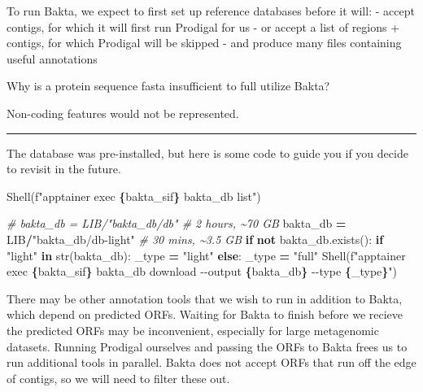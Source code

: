 \documentclass[
]{book}
\newenvironment{Shaded}{\begin{snugshade}}{\end{snugshade}}
\newcommand{\BuiltInTok}[1]{#1}
\newcommand{\CommentTok}[1]{\textcolor[rgb]{0.56,0.35,0.01}{\textit{#1}}}
\newcommand{\ControlFlowTok}[1]{\textcolor[rgb]{0.13,0.29,0.53}{\textbf{#1}}}
\newcommand{\KeywordTok}[1]{\textcolor[rgb]{0.13,0.29,0.53}{\textbf{#1}}}
\newcommand{\NormalTok}[1]{#1}
\newcommand{\OperatorTok}[1]{\textcolor[rgb]{0.81,0.36,0.00}{\textbf{#1}}}
\newcommand{\SpecialCharTok}[1]{\textcolor[rgb]{0.81,0.36,0.00}{\textbf{#1}}}
\newcommand{\SpecialStringTok}[1]{\textcolor[rgb]{0.31,0.60,0.02}{#1}}
\newcommand{\StringTok}[1]{\textcolor[rgb]{0.31,0.60,0.02}{#1}}
\begin{document}
To run Bakta, we expect to first set up reference databases before it will:
- accept contigs, for which it will first run Prodigal for us
- or accept a list of regions + contigs, for which Prodigal will be skipped
- and produce many files containing useful annotations

Why is a protein sequence fasta insufficient to full utilize Bakta?

Non-coding features would not be represented.

\begin{center}\rule{0.5\linewidth}{0.5pt}\end{center}

The database was pre-installed, but here is some code to guide you if you decide to revisit in the future.

\begin{Shaded}
\begin{Highlighting}[numbers=left,,]
\NormalTok{Shell(}\SpecialStringTok{f"apptainer exec }\SpecialCharTok{\{}\NormalTok{bakta\_sif}\SpecialCharTok{\}}\SpecialStringTok{ bakta\_db list"}\NormalTok{)}
\end{Highlighting}
\end{Shaded}

\begin{Shaded}
\begin{Highlighting}[numbers=left,,]
\CommentTok{\# bakta\_db = LIB/"bakta\_db/db"        \# 2 hours, \textasciitilde{}70 GB}
\NormalTok{bakta\_db }\OperatorTok{=}\NormalTok{ LIB}\OperatorTok{/}\StringTok{"bakta\_db/db{-}light"}  \CommentTok{\# 30 mins, \textasciitilde{}3.5 GB}
\ControlFlowTok{if} \KeywordTok{not}\NormalTok{ bakta\_db.exists():}
    \ControlFlowTok{if} \StringTok{"light"} \KeywordTok{in} \BuiltInTok{str}\NormalTok{(bakta\_db):}
\NormalTok{        \_type }\OperatorTok{=} \StringTok{"light"}
    \ControlFlowTok{else}\NormalTok{:}
\NormalTok{        \_type }\OperatorTok{=} \StringTok{"full"}
\NormalTok{    Shell(}\SpecialStringTok{f"apptainer exec }\SpecialCharTok{\{}\NormalTok{bakta\_sif}\SpecialCharTok{\}}\SpecialStringTok{ bakta\_db download {-}{-}output }\SpecialCharTok{\{}\NormalTok{bakta\_db}\SpecialCharTok{\}}\SpecialStringTok{ {-}{-}type }\SpecialCharTok{\{}\NormalTok{\_type}\SpecialCharTok{\}}\SpecialStringTok{"}\NormalTok{)}
\end{Highlighting}
\end{Shaded}

There may be other annotation tools that we wish to run in addition to Bakta, which depend on predicted ORFs.
Waiting for Bakta to finish before we recieve the predicted ORFs may be inconvenient, especially for large metagenomic datasets.
Running Prodigal ourselves and passing the ORFs to Bakta frees us to run additional tools in parallel. Bakta does not accept ORFs
that run off the edge of contigs, so we will need to filter these out.
\end{document}
